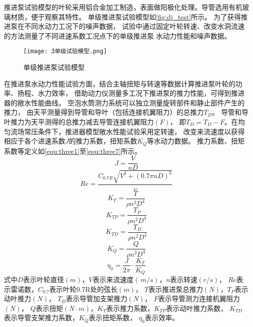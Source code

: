 推进泵试验模型的叶轮采用铝合金加工制造，表面做阳极化处理。导管选用有机玻璃材质，便于观察其特性。
单级推进泵试验模型如\autoref{fig:dj_test}所示。
为了获得推进泵在不同水动力工况下的噪声数据，
试验中通过固定叶轮转速、改变水洞流速的方法测量了不同进速系数工况点下的单级推进泵
水动力性能和噪声数据。
\begin{figure}[htbp]
    \centering
    \texttt{[image: 3单级试验模型.png]}
    \caption{\label{fig:dj_test}单级推进泵试验模型}
\end{figure}

在推进泵水动力性能试验方面，结合主轴扭矩与转速等数据计算推进泵叶轮的功率、扬程、水力效率，
借助动力仪测量多工况下推进泵的推力性能，可得到推进器的敞水性能曲线。
空泡水筒测力系统可以独立测量旋转部件和静止部件产生的推力，
由天平测量得到导管和导叶（包括连接机翼阻力）的总推力$T_{D}$。
导管和导叶推力为天平测得的总推力减去导管连接机翼阻力$(F)$，
即$T_{D}=T_{D}-F$。在均匀流场常压条件下，推进器模型敞水性能试验采用定转速，
改变来流速度以获得相应于各个进速系数$J$的推力系数，扭矩系数$K_{Q}$等水动力数据。
推力系数、扭矩系数等定义如\autoref{equ:three1}至\autoref{equ:three7}所示。
\begin{equation}
    \label{equ:three1}
    J=\frac{V}{nD} 
\end{equation}
\begin{equation}
    \label{equ:three2}
    Re =\frac{C_{0.7R}\sqrt{V^{2}+\left ( 0.7\pi nD \right )^{2}   }  }{\upsilon } 
\end{equation}
\begin{equation}
    \label{equ:three3}
    K_{T}=\frac{T}{\rho n^{2}D^{4}  }  
\end{equation}
\begin{equation}
    \label{equ:three4}
    K_{TP}=\frac{T_{P} }{\rho n^{2}D^{4}  }  
\end{equation}
\begin{equation}
    \label{equ:three5}
    K_{TD}=\frac{T_{D} }{\rho n^{2}D^{4}  }  
\end{equation}
\begin{equation}
    \label{equ:three6}
    K_{Q}=\frac{Q}{\rho n^{2}D^{4}  }  
\end{equation}
\begin{equation}
    \label{equ:three7}
    \eta _{0} =\frac{J}{2\pi } \cdot \frac{K_{T} }{K_{Q}} 
\end{equation}
式中$D$表示叶轮直径$(m)$，$V$表示来流速度$(\,m/s)$，$n$表示转速$(r/s)$，
$Re$表示雷诺数，$C_{0.7}$表示叶轮0.7R处的弦长$(m)$，
$T$表示推进泵总推力$(N)$，$T_{P}$表示动叶推力$(N)$，
$T_{D} $表示导管加支架推力$(N)$，
$F$表示导管测力连接机翼阻力$(N)$，
$Q$表示扭矩$(N \cdot m)$，$K_{T}$表示推力系数，$K_{TP}$表示动叶推力系数，
$K_{TD}$表示导管支架推力系数，$K_{Q}$表示扭矩系数，
$\eta _{0}$表示效率。

